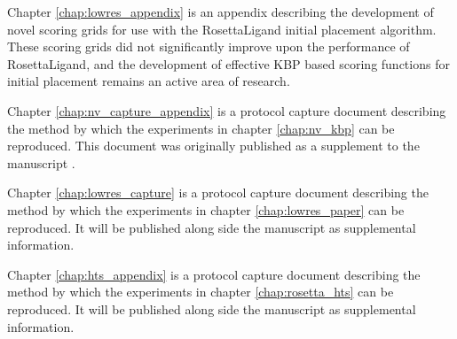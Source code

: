 Chapter \ref{chap:lowres_appendix} is an appendix describing the development of novel scoring grids for use with the RosettaLigand initial placement algorithm.
These scoring grids did not significantly improve upon the performance of RosettaLigand, and the development of effective \ac{KBP} based scoring functions for initial placement remains an active area of research. 

Chapter \ref{chap:nv_capture_appendix} is a protocol capture document describing the method by which the experiments in chapter \ref{chap:nv_kbp} can be reproduced.
This document was originally published as a supplement to the manuscript \citep{DeLuca:2011gg}.

Chapter \ref{chap:lowres_capture} is a protocol capture document describing the method by which the experiments in chapter \ref{chap:lowres_paper} can be reproduced.
It will be published along side the manuscript as supplemental information.

Chapter \ref{chap:hts_appendix} is a protocol capture document describing the method by which the experiments in chapter \ref{chap:rosetta_hts} can be reproduced.
It will be published along side the manuscript as supplemental information.